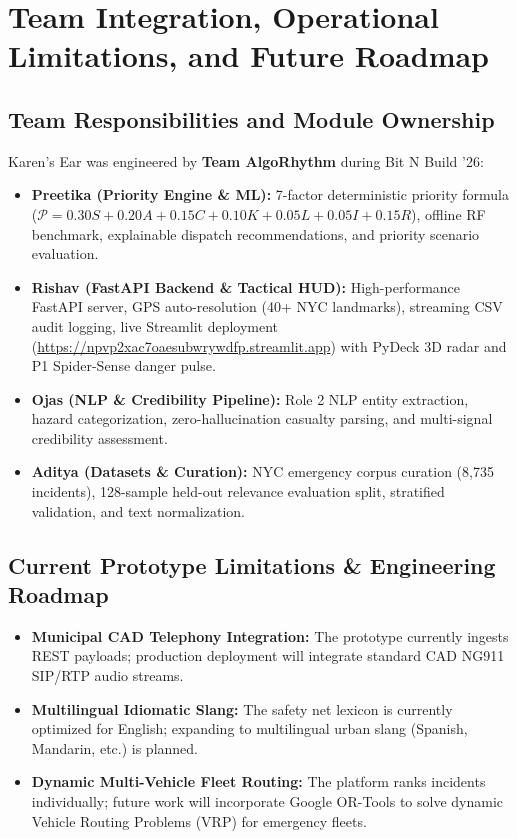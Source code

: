 \documentclass[10pt,a4paper]{article}
\begin{document}
\section{Team Integration, Operational Limitations, and Future Roadmap}
\subsection{Team Responsibilities and Module Ownership}
Karen's Ear was engineered by \textbf{Team AlgoRhythm} during Bit N Build '26:
\begin{itemize}
  \item \textbf{Preetika (Priority Engine \& ML):} 7-factor deterministic priority formula ($\mathcal{P} = 0.30S + 0.20A + 0.15C + 0.10K + 0.05L + 0.05I + 0.15R$), offline RF benchmark, explainable dispatch recommendations, and priority scenario evaluation.
  \item \textbf{Rishav (FastAPI Backend \& Tactical HUD):} High-performance FastAPI server, GPS auto-resolution (40+ NYC landmarks), streaming CSV audit logging, live Streamlit deployment (\url{https://npvp2xac7oaesubwrywdfp.streamlit.app}) with PyDeck 3D radar and P1 Spider-Sense danger pulse.
  \item \textbf{Ojas (NLP \& Credibility Pipeline):} Role 2 NLP entity extraction, hazard categorization, zero-hallucination casualty parsing, and multi-signal credibility assessment.
  \item \textbf{Aditya (Datasets \& Curation):} NYC emergency corpus curation (8,735 incidents), 128-sample held-out relevance evaluation split, stratified validation, and text normalization.
\end{itemize}

\subsection{Current Prototype Limitations \& Engineering Roadmap}
\begin{itemize}
  \item \textbf{Municipal CAD Telephony Integration:} The prototype currently ingests REST payloads; production deployment will integrate standard CAD NG911 SIP/RTP audio streams.
  \item \textbf{Multilingual Idiomatic Slang:} The safety net lexicon is currently optimized for English; expanding to multilingual urban slang (Spanish, Mandarin, etc.) is planned.
  \item \textbf{Dynamic Multi-Vehicle Fleet Routing:} The platform ranks incidents individually; future work will incorporate Google OR-Tools to solve dynamic Vehicle Routing Problems (VRP) for emergency fleets.
\end{itemize}
\end{document}
